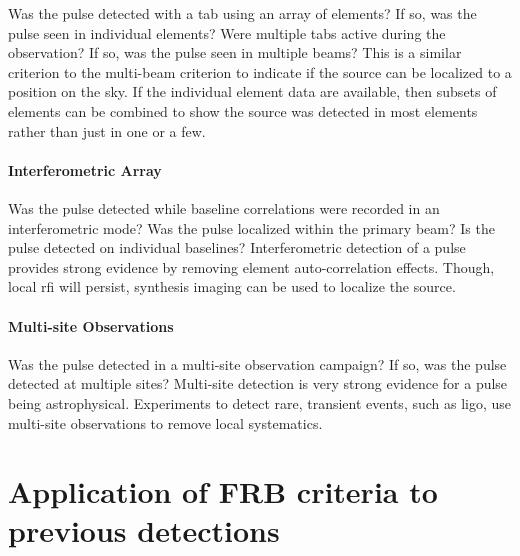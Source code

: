 \documentclass[a4paper,fleqn,usenatbib]{mnras}
\begin{document}
Was the pulse detected with a \gls{tab} using an array of elements? If so, was
the pulse seen in individual elements? Were multiple \glspl{tab} active during
the observation? If so, was the pulse seen in multiple beams? This is a similar
criterion to the multi-beam criterion to indicate if the source can be localized
to a position on the sky. If the individual element data are available, then
subsets of elements can be combined to show the source was detected in most
elements rather than just in one or a few.

\paragraph{Interferometric Array}

Was the pulse detected while baseline correlations were recorded in an
interferometric mode? Was the pulse localized within the primary beam? Is the
pulse detected on individual baselines? Interferometric detection of a pulse
provides strong evidence by removing element auto-correlation effects. Though,
local \gls{rfi} will persist, synthesis imaging can be used to localize the
source.

\paragraph{Multi-site Observations}

Was the pulse detected in a multi-site observation campaign? If so, was the
pulse detected at multiple sites? Multi-site detection is very strong evidence
for a pulse being astrophysical. Experiments to detect rare, transient events,
such as \gls{ligo}, use multi-site observations to remove local systematics.

\section{Application of FRB criteria to previous detections}
\label{sec:appln_to_previous_detections}
\end{document}
